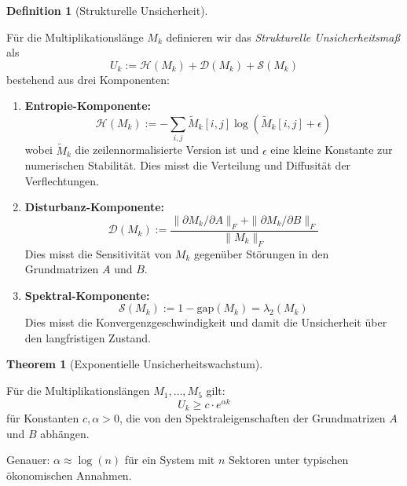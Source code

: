 \documentclass[a4paper,12pt]{article}
\theoremstyle{definition}
\newtheorem{definition}{Definition}
\newtheorem{theorem}{Theorem}
\begin{document}
\begin{definition}[Strukturelle Unsicherheit]
\label{def:unsicherheit}

Für die Multiplikationslänge $M_k$ definieren wir das \emph{Strukturelle Unsicherheitsmaß} als
\[
U_k := \mathcal{H}(M_k) + \mathcal{D}(M_k) + \mathcal{S}(M_k)
\]
bestehend aus drei Komponenten:

\begin{enumerate}
\item \textbf{Entropie-Komponente:}
\[
\mathcal{H}(M_k) := -\sum_{i,j} \tilde{M}_{k}[i,j] \log(\tilde{M}_{k}[i,j] + \epsilon)
\]
wobei $\tilde{M}_k$ die zeilennormalisierte Version ist und $\epsilon$ eine kleine Konstante zur numerischen Stabilität. Dies misst die Verteilung und Diffusität der Verflechtungen.

\item \textbf{Disturbanz-Komponente:}
\[
\mathcal{D}(M_k) := \frac{\|\partial M_k / \partial A\|_F + \|\partial M_k / \partial B\|_F}{\|M_k\|_F}
\]
Dies misst die Sensitivität von $M_k$ gegenüber Störungen in den Grundmatrizen $A$ und $B$.

\item \textbf{Spektral-Komponente:}
\[
\mathcal{S}(M_k) := 1 - \text{gap}(M_k) = \lambda_2(M_k)
\]
Dies misst die Konvergenzgeschwindigkeit und damit die Unsicherheit über den langfristigen Zustand.
\end{enumerate}
\end{definition}

\begin{theorem}[Exponentielle Unsicherheitswachstum]
\label{thm:exponential_unsicherheit}

Für die Multiplikationslängen $M_1, \ldots, M_5$ gilt:
\[
U_k \geq c \cdot e^{\alpha k}
\]
für Konstanten $c, \alpha > 0$, die von den Spektraleigenschaften der Grundmatrizen $A$ und $B$ abhängen.

Genauer: $\alpha \approx \log(n)$ für ein System mit $n$ Sektoren unter typischen ökonomischen Annahmen.

\end{theorem}
\end{document}
